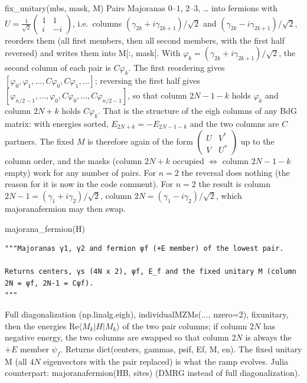 \documentclass[11pt]{article}
\newcommand{\codeus}{\textunderscore\allowbreak}
\renewcommand{\code}[1]{{\ttfamily\let\_\codeus #1}}
\begin{document}
\begin{function}{fix\_unitary(mbs, mask, M)}
Pairs Majoranas $0$–$1$, $2$–$3$, … into fermions with $U=\frac{1}{\sqrt2}\begin{pmatrix}1&1\\i&-i\end{pmatrix}$, i.e.\ columns $(\gamma_{2k}+i\gamma_{2k+1})/\sqrt2$ and $(\gamma_{2k}-i\gamma_{2k+1})/\sqrt2$, reorders them (all first members, then all second members, with the first half reversed) and writes them into \code{M[:, mask]}.
With $\varphi_k=(\gamma_{2k}+i\gamma_{2k+1})/\sqrt2$, the second column of each pair is $C\varphi_k$. The first reordering gives
$[\varphi_0,\varphi_1,\dots,C\varphi_0,C\varphi_1,\dots]$; reversing the first half gives $[\varphi_{n/2-1},\dots,\varphi_0,C\varphi_0,\dots,C\varphi_{n/2-1}]$, so that
column $2N-1-k$ holds $\varphi_k$ and column $2N+k$ holds $C\varphi_k$. That is the structure of the \code{eigh} columns of any BdG matrix: with
energies sorted, $E_{2N+k}=-E_{2N-1-k}$ and the two columns are $C$ partners. The fixed $M$ is therefore again of the form
$\begin{pmatrix}U&V^*\\V&U^*\end{pmatrix}$ up to the column order, and the masks (column $2N+k$ occupied $\Leftrightarrow$ column $2N-1-k$ empty) work for
any number of pairs. For $n=2$ the reversal does nothing (the reason for it is now in the code comment). For $n=2$ the result is column $2N-1=(\gamma_1+i\gamma_2)/\sqrt2$, column $2N=(\gamma_1-i\gamma_2)/\sqrt2$, which \code{majorana\_fermion} may then swap.
\end{function}

\begin{function}{majorana\_fermion(H)}
\begin{Verbatim}
"""Majoranas γ1, γ2 and fermion ψf (+E member) of the lowest pair.

Returns centers, γs (4N x 2), ψf, E_f and the fixed unitary M (column 2N = ψf, 2N-1 = Cψf).
"""
\end{Verbatim}
Full diagonalization (\code{np.linalg.eigh}), \code{individual\_MZMs(..., nzero=2)}, \code{fix\_unitary}, then the energies $\mathrm{Re}\langle M_k|H|M_k\rangle$ of the two pair columns; if column $2N$ has negative energy, the two columns are swapped so that column $2N$ is always the $+E$ member $\psi_f$. Returns \code{dict(centers, gammas, psi\_f, E\_f, M, en)}. The fixed unitary \code{M} (all $4N$ eigenvectors with the pair replaced) is what the ramp evolves. Julia counterpart: \code{majorana\_fermion(HB, sites)} (DMRG instead of full diagonalization).
\end{function}
\end{document}
